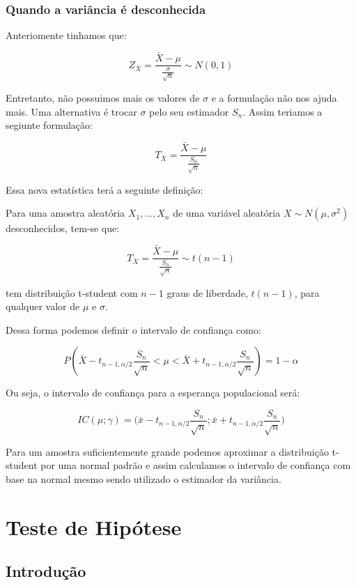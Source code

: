 \documentclass[
  letterpaper,
  DIV=11,
  numbers=noendperiod]{scrartcl}
\begin{document}
\subsubsection{Quando a variância é
desconhecida}\label{quando-a-variuxe2ncia-uxe9-desconhecida}

Anteriomente tinhamos que:

\[Z_{\bar{X}}=\frac{\bar{X}-\mu}{\frac{\sigma}{\sqrt{n}}} \sim N(0,1)\]

Entretanto, não possuimos mais os valores de \(\sigma\) e a formulação
não nos ajuda mais. Uma alternativa é trocar \(\sigma\) pelo seu
estimador \(S_n\). Assim teriamos a segiunte formulação:

\[T_{\bar{X}}=\frac{\bar{X}-\mu}{\frac{S_n}{\sqrt{n}}}\]

Essa nova estatística terá a seguinte definição:

\begin{definicao}

Para uma amostra aleatória \(X_1,...,X_n\) de uma variável aleatória
\(X \sim N(\mu, \sigma^2)\) desconhecidos, tem-se que:

\[T_{{\bar{X}}}=\frac{\bar{X}-\mu}{\frac{S_n}{\sqrt{n}}} \sim t(n-1)\]

tem distribuição t-student com \(n-1\) graus de liberdade, \(t(n-1)\),
para qualquer valor de \(\mu\) e \(\sigma\).

\end{definicao}

Dessa forma podemos definir o intervalo de confiança como:

\[P(\bar{X}-t_{n-1,\alpha/2}\frac{S_n}{\sqrt{n}} <\mu< \bar{X}+ t_{n-1,\alpha/2}\frac{S_n}{\sqrt{n}})=1-\alpha\]

Ou seja, o intervalo de confiança para a esperança populacional será:

\[IC(\mu;\gamma)=\bigg( \bar{x}-t_{n-1,\alpha/2}\frac{S_n}{\sqrt{n}};\bar{x}+t_{n-1,\alpha/2}\frac{S_n}{\sqrt{n}}\bigg)\]

Para um amostra suficientemente grande podemos aproximar a distribuição
t-student por uma normal padrão e assim calculamos o intervalo de
confiança com base na normal mesmo sendo utilizado o estimador da
variância.

\section{Teste de Hipótese}\label{teste-de-hipuxf3tese}

\subsection{Introdução}\label{introduuxe7uxe3o-2}
\end{document}
